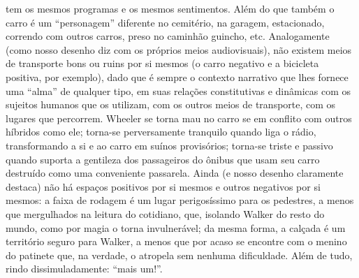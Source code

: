 \begin{multicols}{2}
tem os mesmos programas e os mesmos sentimentos.\allowbreak{} Além do que também o carro é um “personagem” diferente no cemitério,\allowbreak{} na garagem,\allowbreak{} estacionado,\allowbreak{} correndo com outros carros,\allowbreak{} preso no caminhão guincho,\allowbreak{} etc.\allowbreak{} Analogamente (\allowbreak{}como nosso desenho diz com os próprios meios audiovisuais)\allowbreak{},\allowbreak{} não existem meios de transporte bons ou ruins por si mesmos (\allowbreak{}o carro negativo e a bicicleta positiva,\allowbreak{} por exemplo)\allowbreak{},\allowbreak{} dado que é sempre o contexto narrativo que lhes fornece uma “alma” de qualquer tipo,\allowbreak{} em suas relações constitutivas e dinâmicas com os sujeitos humanos que os utilizam,\allowbreak{} com os outros meios de transporte,\allowbreak{} com os lugares que percorrem.\allowbreak{} Wheeler se torna mau no carro se em conflito com outros híbridos como ele; torna-\allowbreak{}se perversamente tranquilo quando liga o rádio,\allowbreak{} transformando a si e ao carro em suínos provisórios; torna-\allowbreak{}se triste e passivo quando suporta a gentileza dos passageiros do ônibus que usam seu carro destruído como uma conveniente passarela.\allowbreak{} Ainda (\allowbreak{}e nosso desenho claramente destaca)\allowbreak{} não há espaços positivos por si mesmos e outros negativos por si mesmos:\allowbreak{} a faixa de rodagem é um lugar perigosíssimo para os pedestres,\allowbreak{} a menos que mergulhados na leitura do cotidiano,\allowbreak{} que,\allowbreak{} isolando Walker do resto do mundo,\allowbreak{} como por magia o torna invulnerável; da mesma forma,\allowbreak{} a calçada é um território seguro para Walker,\allowbreak{} a menos que por acaso se encontre com o menino do patinete que,\allowbreak{} na verdade,\allowbreak{} o atropela sem nenhuma dificuldade.\allowbreak{} Além de tudo,\allowbreak{} rindo dissimuladamente:\allowbreak{} “mais um!\allowbreak{}”.\allowbreak{}

\end{multicols}
\medskip\par\noindent
